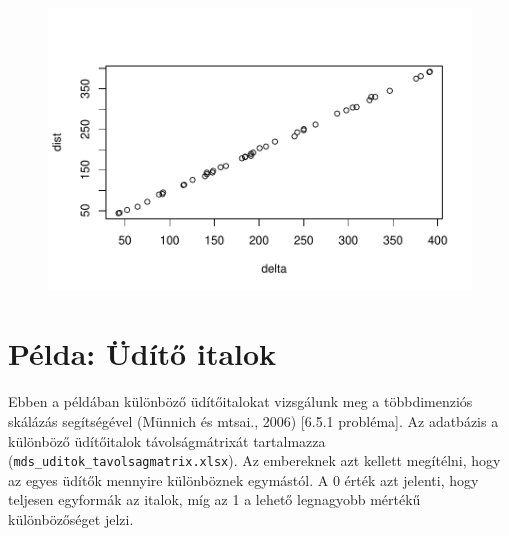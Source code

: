 \documentclass[
  letterpaper,
]{krantz}
\makeatletter
\newenvironment{Shaded}{\begin{snugshade}}{\end{snugshade}}
\newcommand{\FunctionTok}[1]{\textcolor[rgb]{0.28,0.35,0.67}{#1}}
\newcommand{\NormalTok}[1]{\textcolor[rgb]{0.00,0.23,0.31}{#1}}
\newcommand{\OtherTok}[1]{\textcolor[rgb]{0.00,0.23,0.31}{#1}}
\newcommand{\SpecialCharTok}[1]{\textcolor[rgb]{0.37,0.37,0.37}{#1}}
\newenvironment{kframe}{%
\medskip{}
\setlength{\fboxsep}{.8em}
 \def\at@end@of@kframe{}%
 \ifinner\ifhmode%
  \def\at@end@of@kframe{\end{minipage}}%
  \begin{minipage}{\columnwidth}%
 \fi\fi%
 \def\FrameCommand##1{\hskip\@totalleftmargin \hskip-\fboxsep
 \colorbox{shadecolor}{##1}\hskip-\fboxsep
     \hskip-\linewidth \hskip-\@totalleftmargin \hskip\columnwidth}%
 \MakeFramed {\advance\hsize-\width
   \@totalleftmargin\z@ \linewidth\hsize
   \@setminipage}}%
 {\par\unskip\endMakeFramed%
 \at@end@of@kframe}
\renewenvironment{Shaded}{\begin{kframe}}{\end{kframe}}
\makeatother
\begin{document}
\begin{Shaded}
\end{Shaded}

\begin{figure}[H]

{\centering \includegraphics{./sec_tobbdimenzios_skalazas_files/figure-pdf/unnamed-chunk-14-1.pdf}

}

\end{figure}

\hypertarget{puxe9lda-uxfcduxedtux151-italok}{%
\section{Példa: Üdítő italok}\label{puxe9lda-uxfcduxedtux151-italok}}

Ebben a példában különböző üdítőitalokat vizsgálunk meg a többdimenziós
skálázás segítségével (Münnich és mtsai., 2006) {[}6.5.1 probléma{]}. Az
adatbázis a különböző üdítőitalok távolságmátrixát tartalmazza
(\texttt{mds\_uditok\_tavolsagmatrix.xlsx}). Az embereknek azt kellett
megítélni, hogy az egyes üdítők mennyire különböznek egymástól. A 0
érték azt jelenti, hogy teljesen egyformák az italok, míg az 1 a lehető
legnagyobb mértékű különbözőséget jelzi.
\end{document}

